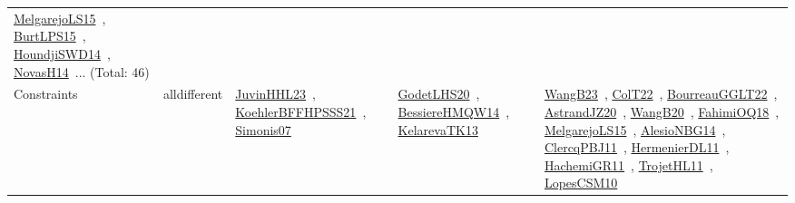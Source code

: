 {\begin{longtable}{lp{3cm}>{\raggedright\arraybackslash}p{6cm}>{\raggedright\arraybackslash}p{6cm}>{\raggedright\arraybackslash}p{8cm}}
\href{papers/MelgarejoLS15.pdf}{MelgarejoLS15}~\cite{MelgarejoLS15}, \href{papers/BurtLPS15.pdf}{BurtLPS15}~\cite{BurtLPS15}, \href{papers/HoundjiSWD14.pdf}{HoundjiSWD14}~\cite{HoundjiSWD14}, \href{articles/NovasH14.pdf}{NovasH14}~\cite{NovasH14}... (Total: 46)\\
Constraints & alldifferent & \href{papers/JuvinHHL23.pdf}{JuvinHHL23}~\cite{JuvinHHL23}, \href{articles/KoehlerBFFHPSSS21.pdf}{KoehlerBFFHPSSS21}~\cite{KoehlerBFFHPSSS21}, \href{articles/Simonis07.pdf}{Simonis07}~\cite{Simonis07} & \href{papers/GodetLHS20.pdf}{GodetLHS20}~\cite{GodetLHS20}, \href{papers/BessiereHMQW14.pdf}{BessiereHMQW14}~\cite{BessiereHMQW14}, \href{papers/KelarevaTK13.pdf}{KelarevaTK13}~\cite{KelarevaTK13} & \href{papers/WangB23.pdf}{WangB23}~\cite{WangB23}, \href{articles/ColT22.pdf}{ColT22}~\cite{ColT22}, \href{articles/BourreauGGLT22.pdf}{BourreauGGLT22}~\cite{BourreauGGLT22}, \href{articles/AstrandJZ20.pdf}{AstrandJZ20}~\cite{AstrandJZ20}, \href{papers/WangB20.pdf}{WangB20}~\cite{WangB20}, \href{articles/FahimiOQ18.pdf}{FahimiOQ18}~\cite{FahimiOQ18}, \href{papers/MelgarejoLS15.pdf}{MelgarejoLS15}~\cite{MelgarejoLS15}, \href{papers/AlesioNBG14.pdf}{AlesioNBG14}~\cite{AlesioNBG14}, \href{papers/ClercqPBJ11.pdf}{ClercqPBJ11}~\cite{ClercqPBJ11}, \href{papers/HermenierDL11.pdf}{HermenierDL11}~\cite{HermenierDL11}, \href{articles/HachemiGR11.pdf}{HachemiGR11}~\cite{HachemiGR11}, \href{articles/TrojetHL11.pdf}{TrojetHL11}~\cite{TrojetHL11}, \href{articles/LopesCSM10.pdf}{LopesCSM10}~\cite{LopesCSM10}\\

\end{longtable}}
